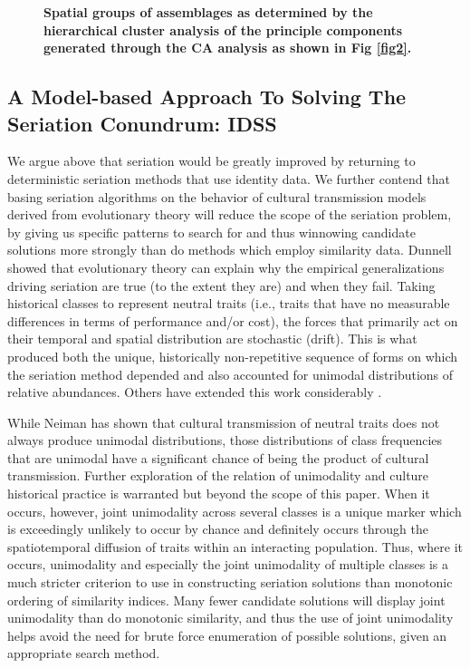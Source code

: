 \documentclass[10pt,letterpaper]{article}
\begin{document}
\begin{figure}[h]
\caption{{\bf Spatial groups of assemblages as determined by the hierarchical cluster analysis of the principle components generated through the CA analysis as shown in Fig \ref{fig2}.}}
\label{fig3}
\end{figure}

\subsection*{A Model-based Approach To Solving The Seriation Conundrum: IDSS}

We argue above that seriation would be greatly improved by returning to deterministic seriation methods that use identity data. We further contend that basing seriation algorithms on the behavior of cultural transmission models derived from evolutionary theory will reduce the scope of the seriation problem, by giving us specific patterns to search for and thus winnowing candidate solutions more strongly than do methods which employ similarity data. Dunnell \cite{Dunnell1982} showed that evolutionary theory can explain why the empirical generalizations driving seriation are true (to the extent they are) and when they fail. Taking historical classes to represent neutral traits (i.e., traits that have no measurable differences in terms of performance and/or cost), the forces that primarily act on their temporal and spatial distribution are stochastic (drift). This is what produced both the unique, historically non-repetitive sequence of forms on which the seriation method depended and also accounted for unimodal distributions of relative abundances. Others have extended this work considerably \cite{Lipo1997Population,Lipo2001a,Lipo2008,lyman2006seriation,Neiman1995,Teltser1995}. 

While Neiman \cite{Neiman1995} has shown that cultural transmission of neutral traits does not always produce unimodal distributions, those distributions of class frequencies that are unimodal have a significant chance of being the product of cultural transmission. Further exploration of the relation of unimodality and culture historical practice is warranted but beyond the scope of this paper. When it occurs, however, joint unimodality across several classes is a unique marker which is exceedingly unlikely to occur by chance and definitely occurs through the spatiotemporal diffusion of traits within an interacting population. Thus, where it occurs, unimodality and especially the joint unimodality of multiple classes is a much stricter criterion to use in constructing seriation solutions than monotonic ordering of similarity indices. Many fewer candidate solutions will display joint unimodality than do monotonic similarity, and thus the use of joint unimodality helps avoid the need for brute force enumeration of possible solutions, given an appropriate search method.
\end{document}
